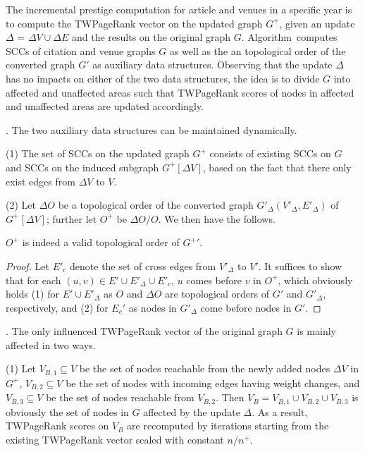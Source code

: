 The incremental prestige computation for article and venues in a specific year is to compute the TWPageRank vector on the updated graph $G^+$, given an update $\Delta$ = $\Delta V\cup\Delta E$ and the results on the original graph $G$.
%
Algorithm~\twprscc computes SCCs of citation and venue graphs $G$ as well as the an topological order of the converted graph $G'$ as auxiliary data structures.
Observing that the update $\Delta$ has no impacts on either of the two data structures, the idea is to divide $G$ into affected and unaffected areas such that TWPageRank scores of nodes in affected and unaffected areas are updated accordingly.


. The two auxiliary data structures can be maintained dynamically.

\sstab(1) The set of SCCs on the updated graph $G^+$ consists of existing SCCs on $G$ and SCCs on the induced subgraph $G^+[\Delta V]$, based on the fact that there only exist edges from $\Delta V$  to $V$.

\sstab(2) Let $\Delta O$ be a topological order of the converted graph $G'_\Delta(V'_\Delta,E'_\Delta)$ of $G^+[\Delta V]$; further let $O^+$ be $\Delta O/O$. We then have the follows.


\begin{lemma} \label{lemma-inc-topo}
$O^+$ is indeed a valid topological order of $G^+{'}$.
\end{lemma}

\begin{proof}
Let $E'_c$ denote the set of cross edges from $V'_\Delta$ to $V'$. 
It suffices to show that for each $(u,v)\in E'\cup E'_\Delta \cup E'_c$, $u$ comes before $v$ in $O^+$,
which obviously holds (1) for  $E'\cup E'_\Delta$ as $O$ and $\Delta O$ are topological orders of $G'$ and $G'_\Delta$, respectively, and (2) for $E_{c}'$ as nodes in $G'_\Delta$ come before nodes in $G'$.
\end{proof}

.
The only influenced TWPageRank vector of the original graph $G$ is mainly affected in two ways.



\sstab(1) Let $V_{B,1}\subseteq V$ be the set of nodes reachable from the newly added nodes $\Delta V$ in $G^+$, $V_{B,2}\subseteq V$ be the set of nodes with incoming edges having weight changes, and $V_{B,3}\subseteq V$ be the set of nodes reachable from  $V_{B,2}$.
%
Then $V_B=V_{B,1}\cup V_{B,2}\cup V_{B,3}$ is obviously the set of nodes in $G$ affected by the update $\Delta$.
%
As a result, TWPageRank scores on $V_B$ are recomputed by iterations starting from the existing TWPageRank vector scaled with constant ${n}/{n^+}$.


